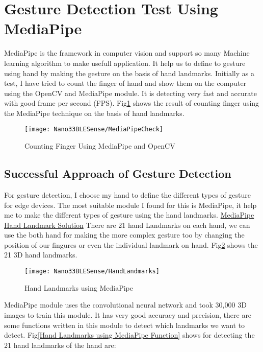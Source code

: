 \section{Gesture Detection Test Using MediaPipe}

MediaPipe is the framework in computer vision and support so many Machine learning algorithm to make usefull application. It help us to define to gesture using hand by making the gesture on the basis of hand landmarks. Initially as a test, I have tried to count the finger of hand and show them on the computer using the OpenCV and MediaPipe module. It is detecting very fast and accurate with good frame per second (FPS). Fig\ref{Counting Finger Using MediaPipe and OpenCV} shows the result of counting finger using the MediaPipe technique on the basis of hand landmarks.

\begin{figure}[h]
	\centering
	\texttt{[image: Nano33BLESense/MediaPipeCheck]}
	\caption{Counting Finger Using MediaPipe and OpenCV}
	\label{Counting Finger Using MediaPipe and OpenCV}
\end{figure}

\subsection{Successful Approach of Gesture Detection} 

For gesture detection, I choose my hand to define the different types of gesture for edge devices. The most suitable module I found for this is MediaPipe, it help me to make the different types of gesture using the hand landmarks. \href{https://google.github.io/mediapipe/solutions/hands.html}{MediaPipe Hand Landmark Solution} There are 21 hand Landmarks on each hand, we can use the both hand for making the more complex gesture too by changing the position of our fingures or even the individual landmark on hand. Fig\ref{Hand Landmarks using MediaPipe} shows the 21 3D hand landmarks.

\begin{figure}[h]
	\centering
	\texttt{[image: Nano33BLESense/HandLandmarks]}
	\caption{Hand Landmarks using MediaPipe}
	\label{Hand Landmarks using MediaPipe}
\end{figure}

MediaPipe module uses the convolutional neural network and took 30,000 3D images to train this module. It has very good accuracy and precision, there are some functions written in this module to detect which landmarks we want to detect. Fig\ref{Hand Landmarks using MediaPipe Function} shows for detecting the 21 hand landmarks of the hand are:

